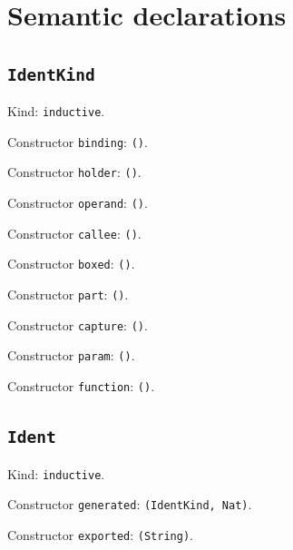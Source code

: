 \documentclass[11pt]{article}
\begin{document}
\section*{Semantic declarations}
\subsection*{\texttt{IdentKind}}
\noindent Kind: \texttt{inductive}.\par
\noindent Constructor \texttt{binding}: \texttt{()}.\par
\noindent Constructor \texttt{holder}: \texttt{()}.\par
\noindent Constructor \texttt{operand}: \texttt{()}.\par
\noindent Constructor \texttt{callee}: \texttt{()}.\par
\noindent Constructor \texttt{boxed}: \texttt{()}.\par
\noindent Constructor \texttt{part}: \texttt{()}.\par
\noindent Constructor \texttt{capture}: \texttt{()}.\par
\noindent Constructor \texttt{param}: \texttt{()}.\par
\noindent Constructor \texttt{function}: \texttt{()}.\par
\subsection*{\texttt{Ident}}
\noindent Kind: \texttt{inductive}.\par
\noindent Constructor \texttt{generated}: \texttt{(IdentKind, Nat)}.\par
\noindent Constructor \texttt{exported}: \texttt{(String)}.\par
\end{document}
